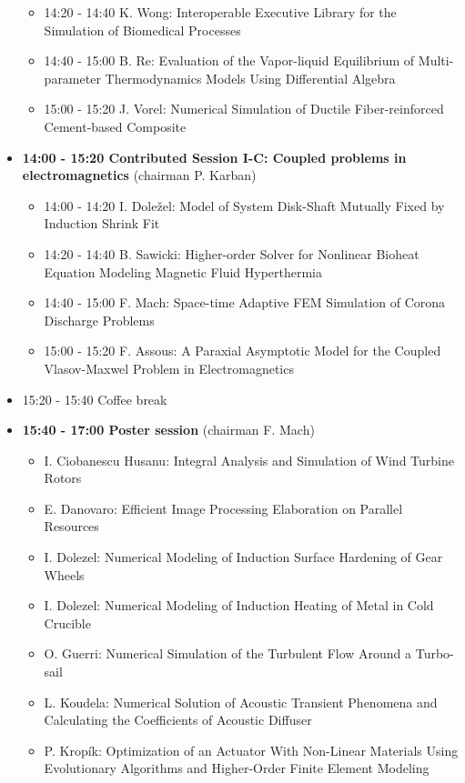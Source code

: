 \documentclass[10pt, A4]{article}%
\begin{document}
\begin{itemize}
\begin{itemize}
    \item 14:20 - 14:40 {K. Wong}: {Interoperable Executive Library for the Simulation of Biomedical Processes}
    \item 14:40 - 15:00 {B. Re}: {Evaluation of the Vapor-liquid Equilibrium of Multi-parameter Thermodynamics Models Using Differential Algebra}
    \item 15:00 - 15:20 {J. Vorel}: {Numerical Simulation of Ductile Fiber-reinforced Cement-based Composite}
  \end{itemize}
    \item {\bf 14:00 - 15:20 Contributed Session I-C: Coupled problems in electromagnetics} (chairman P. Karban) 
  \begin{itemize}
    \item 14:00 - 14:20 {I. Doležel}: {Model of System Disk-Shaft Mutually Fixed by Induction Shrink Fit}
    \item 14:20 - 14:40 {B. Sawicki}: {Higher-order Solver for Nonlinear Bioheat Equation Modeling Magnetic Fluid Hyperthermia}
    \item 14:40 - 15:00 {F. Mach}: {Space-time Adaptive FEM Simulation of Corona Discharge Problems}
    \item 15:00 - 15:20 {F. Assous}: {A Paraxial Asymptotic Model for the Coupled Vlasov-Maxwel Problem in Electromagnetics}  %
    \end{itemize}
  \item 15:20 - 15:40 Coffee break
  \newpage
  \item {\bf 15:40 - 17:00 Poster session} (chairman F. Mach)
  \begin{itemize}
    \item {I. Ciobanescu Husanu}: {Integral Analysis and Simulation of Wind Turbine Rotors}
    \item {E. Danovaro}: {Efficient Image Processing Elaboration on Parallel Resources}
    \item {I. Dolezel}: {Numerical Modeling of Induction Surface Hardening of Gear Wheels}
    \item {I. Dolezel}: {Numerical Modeling of Induction Heating of Metal in Cold Crucible}
    \item {O. Guerri}: {Numerical Simulation of the Turbulent Flow Around a Turbo-sail}
    \item {L. Koudela}: {Numerical Solution of Acoustic Transient Phenomena and Calculating the Coefficients of Acoustic Diffuser}
    \item {P. Kropík}: {Optimization of an Actuator With Non-Linear Materials Using Evolutionary Algorithms and Higher-Order Finite Element Modeling}

\end{itemize}
\end{itemize}
\end{document}
